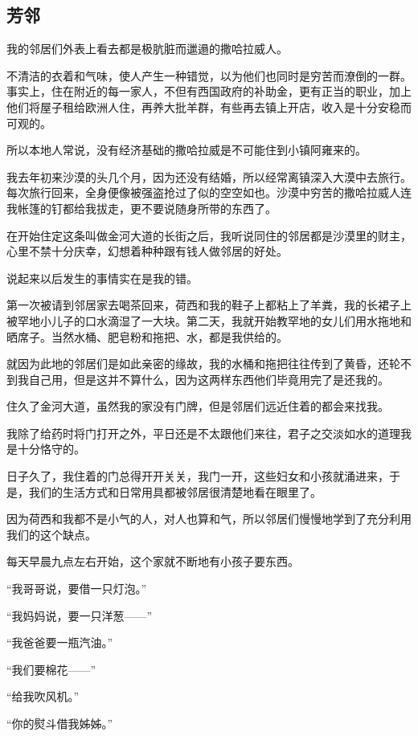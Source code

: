 \subsection{芳邻}


\par 我的邻居们外表上看去都是极肮脏而邋遢的撒哈拉威人。
\par 不清洁的衣着和气味，使人产生一种错觉，以为他们也同时是穷苦而潦倒的一群。事实上，住在附近的每一家人，不但有西国政府的补助金，更有正当的职业，加上他们将屋子租给欧洲人住，再养大批羊群，有些再去镇上开店，收入是十分安稳而可观的。
\par 所以本地人常说，没有经济基础的撒哈拉威是不可能住到小镇阿雍来的。
\par 我去年初来沙漠的头几个月，因为还没有结婚，所以经常离镇深入大漠中去旅行。每次旅行回来，全身便像被强盗抢过了似的空空如也。沙漠中穷苦的撒哈拉威人连我帐篷的钉都给我拔走，更不要说随身所带的东西了。
\par 在开始住定这条叫做金河大道的长街之后，我听说同住的邻居都是沙漠里的财主，心里不禁十分庆幸，幻想着种种跟有钱人做邻居的好处。
\par 说起来以后发生的事情实在是我的错。
\par 第一次被请到邻居家去喝茶回来，荷西和我的鞋子上都粘上了羊粪，我的长裙子上被罕地小儿子的口水滴湿了一大块。第二天，我就开始教罕地的女儿们用水拖地和晒席子。当然水桶、肥皂粉和拖把、水，都是我供给的。
\par 就因为此地的邻居们是如此亲密的缘故，我的水桶和拖把往往传到了黄昏，还轮不到我自己用，但是这并不算什么，因为这两样东西他们毕竟用完了是还我的。
\par 住久了金河大道，虽然我的家没有门牌，但是邻居们远近住着的都会来找我。
\par 我除了给药时将门打开之外，平日还是不太跟他们来往，君子之交淡如水的道理我是十分恪守的。
\par 日子久了，我住着的门总得开开关关，我门一开，这些妇女和小孩就涌进来，于是，我们的生活方式和日常用具都被邻居很清楚地看在眼里了。
\par 因为荷西和我都不是小气的人，对人也算和气，所以邻居们慢慢地学到了充分利用我们的这个缺点。
\par 每天早晨九点左右开始，这个家就不断地有小孩子要东西。
\par “我哥哥说，要借一只灯泡。”
\par “我妈妈说，要一只洋葱——”
\par “我爸爸要一瓶汽油。”
\par “我们要棉花——”
\par “给我吹风机。”
\par “你的熨斗借我姊姊。”
